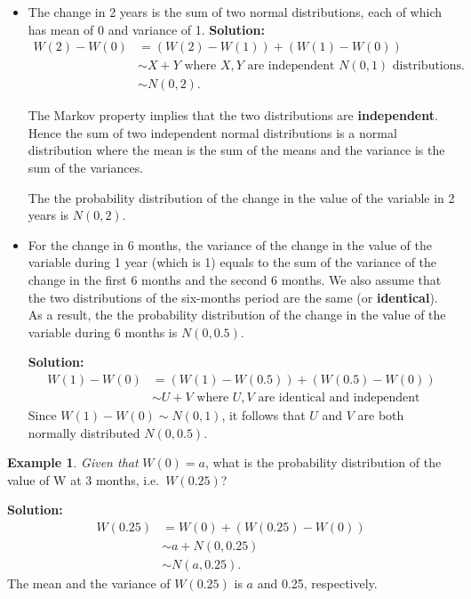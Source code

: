 \documentclass[
]{book}
\theoremstyle{definition}
\theoremstyle{definition}
\newtheorem{example}{Example}[chapter]
\theoremstyle{definition}
\theoremstyle{definition}
\theoremstyle{remark}
\begin{document}
\begin{itemize}
  \begin{itemize}
  \item
    The change in 2 years is the sum of two normal distributions,
    each of which has mean of 0 and variance of 1. \textbf{Solution:}
    \[\begin{aligned}
        W(2) - W(0) &= (W(2) - W(1)) +  (W(1) - W(0)) \\
                  &\sim X + Y \text{ where } X, Y \text{ are independent } N(0,1)                   \text{ distributions.}  \\
                  &\sim N(0,2).\end{aligned}\]

    The Markov property implies that the two distributions are
    \textbf{independent}. Hence the sum of two independent normal
    distributions is a normal distribution where the mean is the sum
    of the means and the variance is the sum of the variances.

    The the probability distribution of the change in the value of
    the variable in 2 years is \(N(0,2)\).
  \item
    For the change in 6 months, the variance of the change in the
    value of the variable during 1 year (which is 1) equals to the
    sum of the variance of the change in the first 6 months and the
    second 6 months. We also assume that the two distributions of
    the six-months period are the same (or \textbf{identical}). As a
    result, the the probability distribution of the change in the
    value of the variable during 6 months is \(N(0,0.5)\).

    \textbf{Solution:} \[\begin{aligned}
        W(1) - W(0) &= (W(1) - W(0.5)) +  (W(0.5) - W(0)) \\
                  &\sim U + V \text{ where } U, V \text{ are identical and independent}\end{aligned}\]
    Since \(W(1) - W(0) \sim N(0,1)\), it follows that \(U\) and \(V\) are
    both normally distributed \(N(0,0.5)\).
  \end{itemize}
\end{itemize}

\begin{example}
\emph{Given that} \(W(0) = a\), what is the probability distribution of the
value of W at 3 months, i.e.~\(W(0.25)\)?
\end{example}

\textbf{Solution:} \[\begin{aligned}
    W(0.25) &= W(0) + (W(0.25) - W(0)) \\
            & \sim a + N(0,0.25)  \\
            & \sim N(a, 0.25).\end{aligned}\] The mean and the variance
of \(W(0.25)\) is \(a\) and 0.25, respectively.
\end{document}
